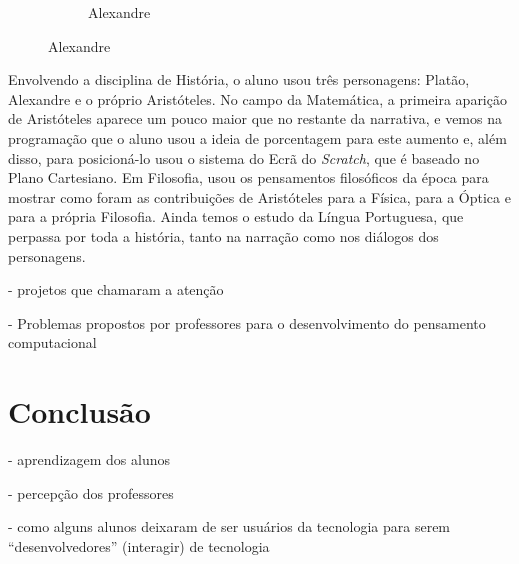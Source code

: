 \documentclass[12pt, openright, a4paper, brazil, english, french, spanish, bibjustif, openany, oneside]{abntex2}
\begin{document}
\begin{figure}[H]
\begin{subfigure}[b]{0.3\textwidth}
         \caption*{Alexandre}
         \label{alexandre}
     \end{subfigure}
     
    
\end{figure}

Envolvendo a disciplina de História, o aluno usou três personagens: Platão, Alexandre e o próprio Aristóteles. No campo da Matemática, a primeira aparição de Aristóteles aparece um pouco maior que no restante da narrativa, e vemos na programação que o aluno usou a ideia de porcentagem para este aumento e, além disso, para posicioná-lo usou o sistema do Ecrã do \textit{Scratch}, que é baseado no Plano Cartesiano. Em Filosofia, usou os pensamentos filosóficos da época para mostrar como foram as contribuições de Aristóteles para a Física, para a Óptica e para a própria Filosofia. Ainda temos o estudo da Língua Portuguesa, que perpassa por toda a história, tanto na narração como nos diálogos dos personagens. 



- projetos que chamaram a atenção

- Problemas propostos por professores para o desenvolvimento do pensamento computacional


\chapter*[Conclusão]{Conclusão}

- aprendizagem dos alunos

- percepção dos professores

- como alguns alunos deixaram de ser usuários da tecnologia para serem ``desenvolvedores'' (interagir) de tecnologia


% 



\postextual









\printindex
\end{document}
